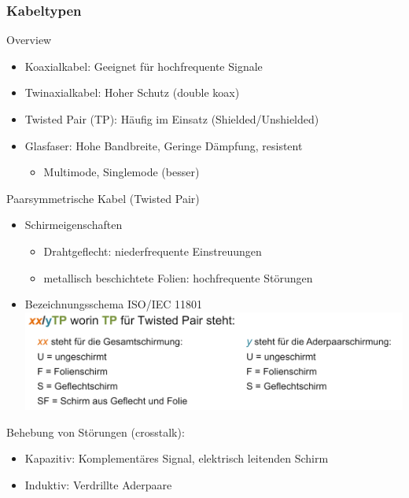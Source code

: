     

    \subsubsection{Kabeltypen}
    \begin{concept}{Overview}
        \begin{itemize}
            \item Koaxialkabel: Geeignet für hochfrequente Signale
            \item Twinaxialkabel: Hoher Schutz (double koax)
            \item Twisted Pair (TP): Häufig im Einsatz (Shielded/Unshielded)
            \item Glasfaser: Hohe Bandbreite, Geringe Dämpfung, resistent
                \begin{itemize}
                    \item Multimode, Singlemode (besser)
                \end{itemize}
        \end{itemize}        
    \end{concept}

    \begin{definition}{Paarsymmetrische Kabel (Twisted Pair)}
        \begin{itemize}
            \item Schirmeigenschaften
            \begin{itemize}
                \item Drahtgeflecht: niederfrequente Einstreuungen
                \item metallisch beschichtete Folien: hochfrequente Störungen
            \end{itemize}
            \item Bezeichnungsschema ISO/IEC 11801\\
            \includegraphics[width=\linewidth]{images/STP_Schirmeigenschaften.png}
        \end{itemize}
        Behebung von Störungen (crosstalk):
        \begin{itemize}
            \item Kapazitiv: Komplementäres Signal, elektrisch leitenden Schirm
            \item Induktiv: Verdrillte Aderpaare
        \end{itemize}
    \end{definition}

    

    
        
    